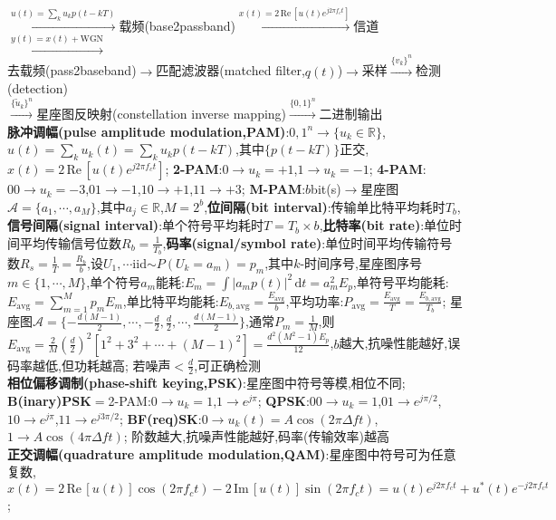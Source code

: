 \documentclass[UTF8,a4paper,10pt]{article}
\providecommand{\abs}[1]{\left\lvert#1\right\rvert}
\providecommand{\re}{\,\mathrm{Re}\,}
\providecommand{\im}{\,\mathrm{Im}\,}
\begin{document}
\begin{multicols*}{2}
    $\overset{u(t)=\sum_ku_kp(t-kT)}{\rightarrow}$载频(base2passband)$\overset{x(t)=2\re[u(t)e^{j2\pi f_ct}]}{\rightarrow}$信道$\overset{y(t)=x(t)+\text{WGN}}{\rightarrow}$\\
    去载频(pass2baseband)$\rightarrow$匹配滤波器(matched filter,$q(t)$)$\rightarrow$采样$\overset{\{v_k\}^n}{\rightarrow}$检测(detection)\\
    $\overset{\{\tilde{u}_k\}^n}{\rightarrow}$星座图反映射(constellation inverse mapping)$\overset{\{0,1\}^n}{\rightarrow}$二进制输出\\
\textbf{脉冲调幅(pulse amplitude modulation,PAM)}:${0,1}^n\rightarrow\{u_k\in\mathbb{R}\}$,$u(t)=\sum_ku_k(t)=\sum_ku_kp(t-kT)$,其中$\{p(t-kT)\}$正交,$x(t)=2\re[u(t)e^{j2\pi f_ct}]$;%
    \textbf{2-PAM}:$0\rightarrow u_k=+1$,$1\rightarrow u_k=-1$;%
    \textbf{4-PAM}:$00\rightarrow u_k=-3$,$01\rightarrow-1$,$10\rightarrow+1$,$11\rightarrow+3$;%
    \textbf{M-PAM}:$b$bit(s)$\rightarrow$星座图$\mathcal{A}=\{a_1,\cdots,a_M\}$,其中$a_j\in\mathbb{R}$,$M=2^b$,\textbf{位间隔(bit interval)}:传输单比特平均耗时$T_b$,\textbf{信号间隔(signal interval)}:单个符号平均耗时$T=T_b\times b$,\textbf{比特率(bit rate)}:单位时间平均传输信号位数$R_b=\frac{1}{T_b}$,\textbf{码率(signal/symbol rate)}:单位时间平均传输符号数$R_s=\frac{1}{T}=\frac{R_b}{b}$,设$U_1,\cdots$iid$\sim P(U_k=a_m)=p_m$,其中$k$-时间序号,星座图序号$m\in\{1,\cdots,M\}$,单个符号$a_m$能耗:$E_m=\int\abs{a_mp(t)}^2\,\mathrm{d}t=a_m^2E_p$,单符号平均能耗:$E_{\text{avg}}=\sum_{m=1}^Mp_mE_m$,单比特平均能耗:$E_{b,\text{avg}}=\frac{E_{\text{avg}}}{b}$,平均功率:$P_{\text{avg}}=\frac{E_{\text{avg}}}{T}=\frac{E_{b,\text{avg}}}{T_b}$;%
    星座图$\mathcal{A}=\{-\frac{d(M-1)}{2},\cdots,-\frac{d}{2},\frac{d}{2},\cdots,\frac{d(M-1)}{2}\}$,通常$P_m=\frac{1}{M}$,则$E_{\text{avg}}=\frac{2}{M}(\frac{d}{2})^2[1^2+3^2+\cdots+(M-1)^2]=\frac{d^2(M^2-1)E_p}{12}$,$b$越大,抗噪性能越好,误码率越低,但功耗越高;%
    若噪声$<\frac{d}{2}$,可正确检测\\
\textbf{相位偏移调制(phase-shift keying,PSK)}:星座图中符号等模,相位不同;%
    \textbf{B(inary)PSK}$=$2-PAM:$0\rightarrow u_k=1$,$1\rightarrow e^{j\pi}$;%
    \textbf{QPSK}:$00\rightarrow u_k=1$,$01\rightarrow e^{j\pi/2}$,$10\rightarrow e^{j\pi}$,$11\rightarrow e^{j3\pi/2}$;%
    \textbf{BF(req)SK}:$0\rightarrow u_k(t)=A\cos(2\pi\Delta ft)$,$1\rightarrow A\cos(4\pi\Delta ft)$;%
    阶数越大,抗噪声性能越好,码率(传输效率)越高\\
\textbf{正交调幅(quadrature amplitude modulation,QAM)}:星座图中符号可为任意复数,$x(t)=2\re[u(t)]\cos(2\pi f_ct)-2\im[u(t)]\sin(2\pi f_ct)=u(t)e^{j2\pi f_ct}+u^*(t)e^{-j2\pi f_ct}$;%

\end{multicols*}
\end{document}
